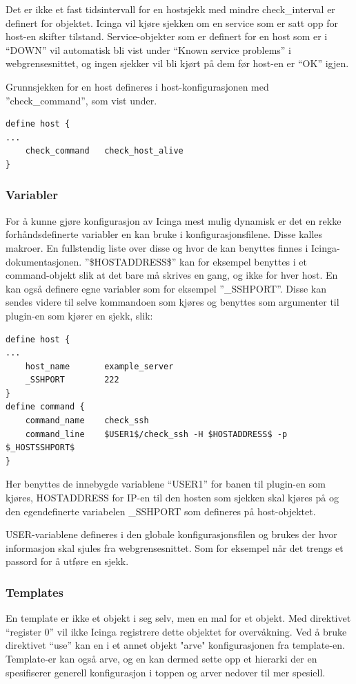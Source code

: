 Det er ikke et fast tidsintervall for en hostsjekk med mindre check\_interval er definert for objektet. Icinga vil kjøre sjekken om en service som er satt opp for host-en skifter tilstand. Service-objekter som er definert for en host som er i ``DOWN'' vil automatisk bli vist under ``Known service problems'' i webgrensesnittet, og ingen sjekker vil bli kjørt på dem før host-en er ``OK'' igjen.

Grunnsjekken for en host defineres i host-konfigurasjonen med ''check\_command'', som vist under.
\begin{lstlisting}[style=example]
define host {
...
    check_command	check_host_alive
}
\end{lstlisting}

\subsubsection{Variabler}
For å kunne gjøre konfigurasjon av Icinga mest mulig dynamisk er det en rekke forhåndsdefinerte variabler en kan bruke i konfigurasjonsfilene. Disse kalles makroer. En fullstendig liste over disse og hvor de kan benyttes finnes i Icinga-dokumentasjonen\cite{icingamacro}. ''\$HOSTADDRESS\$'' kan for eksempel benyttes i et command-objekt slik at det bare må skrives en gang, og ikke for hver host. En kan også definere egne variabler som for eksempel ''\_SSHPORT''. Disse kan sendes videre til selve kommandoen som kjøres og benyttes som argumenter til plugin-en som kjører en sjekk, slik:
\begin{lstlisting}[style=example]
define host {
...
    host_name		example_server
    _SSHPORT		222
}
define command {
    command_name	check_ssh
    command_line	$USER1$/check_ssh -H $HOSTADDRESS$ -p $_HOSTSSHPORT$
}
\end{lstlisting}

Her benyttes de innebygde variablene ``USER1'' for banen til plugin-en som kjøres, HOSTADDRESS for IP-en til den hosten som sjekken skal kjøres på og den egendefinerte variabelen \_SSHPORT som defineres på host-objektet.

USER-variablene defineres i den globale konfigurasjonsfilen og brukes der hvor informasjon skal sjules fra webgrensesnittet. Som for eksempel når det trengs et passord for å utføre en sjekk.

\subsubsection{Templates}
En template er ikke et objekt i seg selv, men en mal for et objekt. Med direktivet ``register 0'' vil ikke Icinga registrere dette objektet for overvåkning. Ved å bruke direktivet ``use'' kan en i et annet objekt "arve" konfigurasjonen fra template-en. Template-er kan også arve, og en kan dermed sette opp et hierarki der en spesifiserer generell konfigurasjon i toppen og arver nedover til mer spesiell. 

